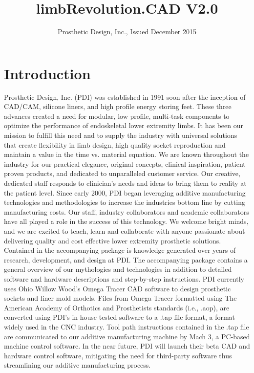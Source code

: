\documentclass[twoside,a4paper]{refrep}
\title{limbRevolution.CAD V2.0}
\author{Prosthetic Design, Inc., Issued December 2015}
\date{}
\begin{document}
	\maketitle
	\tableofcontents
	\newpage
	
	\section{Introduction}
	Prosthetic Design, Inc. (PDI) was established in 1991 soon after the inception of CAD/CAM, silicone liners, and high profile energy storing feet. These three advances created a need for modular, low profile, multi-task components to optimize the performance of endoskeletal lower extremity limbs. It has been our mission to fulfill this need and to supply the industry with universal solutions that create flexibility in limb design, high quality socket reproduction and maintain a value in the time vs. material equation.
	We are known throughout the industry for our practical elegance, original concepts, clinical inspiration, patient proven products, and dedicated to unparalleled customer service. Our creative, dedicated staff responds to clinician’s needs and ideas to bring them to reality at the patient level.
	Since early 2000, PDI began leveraging additive manufacturing technologies and methodologies to increase the industries bottom line by cutting manufacturing costs. Our staff, industry collaborators and academic collaborators have all played a role in the success of this technology. We welcome bright minds, and we are excited to teach, learn and collaborate with anyone passionate about delivering quality and cost effective lower extremity prosthetic solutions.
	Contained in the accompanying package is knowledge generated over years of research, development, and design at PDI. The accompanying package contains a general overview of our mythologies and technologies in addition to detailed software and hardware descriptions and step-by-step instructions.
	PDI currently uses Ohio Willow Wood’s Omega Tracer CAD software to design prosthetic sockets and liner mold models. Files from Omega Tracer formatted using The American Academy of Orthotics and Prosthetists standards (i.e., .aop), are converted using PDI’s in-house tested software to a .tap file format, a format widely used in the CNC industry. Tool path instructions contained in the .tap file are communicated to our additive manufacturing machine by Mach 3, a PC-based machine control software. In the near future, PDI will launch their beta CAD and hardware control software, mitigating the need for third-party software thus streamlining our additive manufacturing process.
\end{document}
